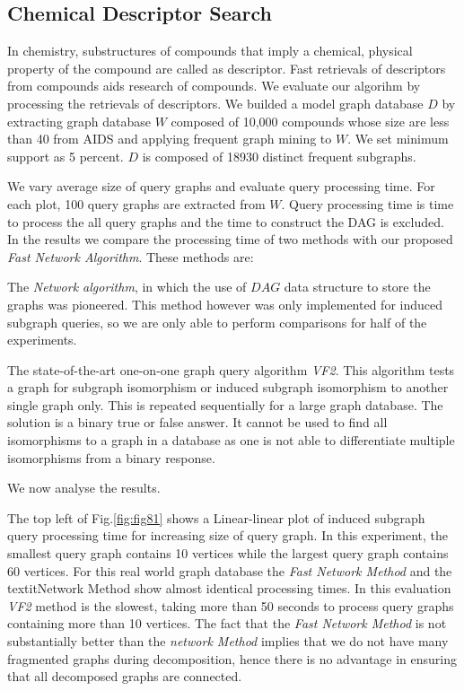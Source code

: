 \subsection{Chemical Descriptor Search}
In chemistry, substructures of compounds that imply a chemical, physical property of the compound are called as descriptor.
Fast retrievals of descriptors from compounds aids research of compounds.
We evaluate our algorihm by processing the retrievals of descriptors.
We builded a model graph database $D$ by extracting graph database $W$ composed of 10,000 compounds whose size are less than 40 from AIDS and applying frequent graph mining to $W$.
We set minimum support as 5 percent.
$D$ is composed of 18930 distinct frequent subgraphs.

We vary average size of query graphs and evaluate query processing time.
For each plot, 100 query graphs are extracted from $W$.
Query processing time is time to process the all query graphs and the time to construct the DAG is excluded. In the results we compare the processing time of two methods with our proposed \textit{Fast Network Algorithm}. These methods are: 

The \textit{Network algorithm}, in which the use of $DAG$ data structure to store the graphs was pioneered. This method however was only implemented for induced subgraph queries, so we are only able to perform comparisons for half of the experiments. 

The state-of-the-art one-on-one graph query algorithm \textit{VF2}. This algorithm  tests a graph for subgraph isomorphism or induced subgraph isomorphism to another single graph only. This is repeated sequentially for a large graph database. The solution is a binary true or false answer. It cannot be used to find all isomorphisms to a graph in a database as one is not able to differentiate multiple isomorphisms from a binary response.

We now analyse the results.

The  top left of Fig.\ref{fig:fig81} shows a Linear-linear plot of induced subgraph query processing time for increasing size of query graph. In this experiment, the smallest query graph contains 10 vertices while the largest query graph contains 60 vertices. For this real world graph database the \textit{Fast Network Method} and the textit{Network Method} show almost identical processing times. In this evaluation \textit{VF2} method is the slowest, taking more than 50 seconds to process query graphs containing more than 10 vertices. The fact that the \textit{Fast Network Method} is not substantially better than the \textit{network Method} implies that we do not have many fragmented graphs during decomposition, hence there is no advantage in ensuring that all decomposed graphs are connected.  

